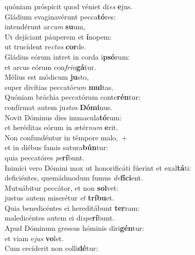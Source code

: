 \oddverse quóniam próspicit quod véniet di\textit{es} \textbf{e}jus.\\
\evenverse Gládium evaginavérunt pecca\textbf{tó}res:~\*\\
\evenverse intendérunt ar\textit{cum} \textbf{su}um,\\
\oddverse Ut dejíciant páuperem et \textbf{í}nopem:~\*\\
\oddverse ut trucídent re\textit{ctos} \textbf{cor}de.\\
\evenverse Gládius eórum intret in corda i\textbf{psó}rum:~\*\\
\evenverse et arcus eórum con\textit{frin}\textbf{gá}tur.\\
\oddverse Mélius est módicum \textbf{ju}sto,~\*\\
\oddverse super divítias peccató\textit{rum} \textbf{mul}tas.\\
\evenverse Quóniam bráchia peccatórum conte\textbf{rén}tur:~\*\\
\evenverse confírmat autem ju\textit{stos} \textbf{Dó}\textbf{mi}nus.\\
\oddverse Novit Dóminus dies immacula\textbf{tó}rum:~\*\\
\oddverse et heréditas eórum in ætér\textit{num} \textbf{e}rit.\\
\evenverse Non confundéntur in témpore malo,~+\\
\evenverse  et in diébus famis satura\textbf{bún}tur:~\*\\
\evenverse quia peccatóres \textit{pe}\textbf{rí}bunt.\\
\oddverse Inimíci vero Dómini mox ut honorificáti fúerint et exal\textbf{tá}ti:~\*\\
\oddverse deficiéntes, quemádmodum fumus \textit{de}\textbf{fí}\textbf{ci}ent.\\
\evenverse Mutuábitur peccátor, et non \textbf{sol}vet:~\*\\
\evenverse justus autem miserétur \textit{et} \textbf{trí}\textbf{bu}et.\\
\oddverse Quia benedicéntes ei hereditábunt \textbf{ter}ram:~\*\\
\oddverse maledicéntes autem ei di\textit{spe}\textbf{rí}bunt.\\
\evenverse Apud Dóminum gressus hóminis diri\textbf{gén}tur:~\*\\
\evenverse et viam e\textit{jus} \textbf{vo}let.\\
\oddverse Cum cecíderit non colli\textbf{dé}tur:~\*\\
